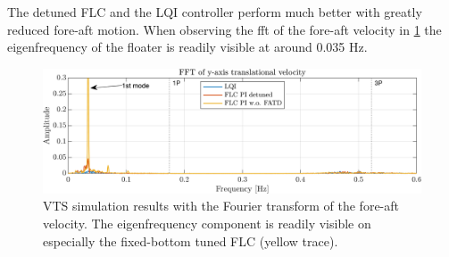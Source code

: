 The detuned FLC and the LQI controller perform much better with greatly reduced fore-aft motion. When observing the fft of the fore-aft velocity in \cref{fig:vts_4_fft_py} the eigenfrequency of the floater is readily visible at around 0.035 Hz.


\begin{figure}[h]
	\centering
	\includegraphics[width=0.7\linewidth]{Graphics/TestResults/VTSplotting/4_fft_py.png}
	\caption{VTS simulation results with the Fourier transform of the fore-aft velocity. The eigenfrequency component is readily visible on especially the fixed-bottom tuned FLC (yellow trace).}
	\label{fig:vts_4_fft_py}
\end{figure}

